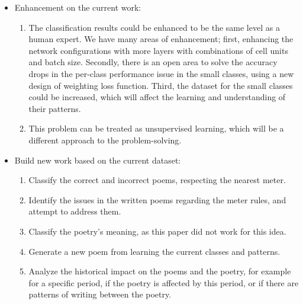 \begin{itemize}
  \item Enhancement on the current work:
  \begin{enumerate}
    \item The classification results could be enhanced to be the same level as a human expert. We have many areas of enhancement; first, enhancing the network configurations with more layers with combinations of cell units and batch size. Secondly, there is an open area to solve the accuracy drops in the per-class performance issue in the small classes, using a new design of weighting loss function. Third, the dataset for the small classes could be increased, which will affect the learning and understanding of their patterns.

    \item This problem can be treated as unsupervised learning, which will be a different approach to the problem-solving.
  \end{enumerate}
  \item Build new work based on the current dataset:
    \begin{enumerate}
    \item Classify the correct and incorrect poems, respecting the nearest meter.
    \item Identify the issues in the written poems regarding the meter rules, and attempt to address them.
    \item Classify the poetry’s meaning, as this paper did not work for this idea.
    \item Generate a new poem from learning the current classes and patterns.
    \item Analyze the historical impact on the poems and the poetry, for example for a specific period, if the poetry is affected by this period, or if there are patterns of writing between the poetry.
  \end{enumerate}
  
\end{itemize}


